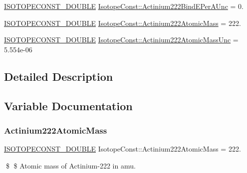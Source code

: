 \begin{DoxyCompactItemize}
\mbox{\hyperlink{group___isotope_const-_macros_ga8f45a7272ce02c0b4c65c44636ed719a}{I\+S\+O\+T\+O\+P\+E\+C\+O\+N\+S\+T\+\_\+\+D\+O\+U\+B\+LE}} \mbox{\hyperlink{group___isotope_const-_actinium-_ac222_ga3478d09e80a5c8eec554208d4afb40cb}{Isotope\+Const\+::\+Actinium222\+Bind\+E\+Per\+A\+Unc}} = 0.
\item 
\mbox{\hyperlink{group___isotope_const-_macros_ga8f45a7272ce02c0b4c65c44636ed719a}{I\+S\+O\+T\+O\+P\+E\+C\+O\+N\+S\+T\+\_\+\+D\+O\+U\+B\+LE}} \mbox{\hyperlink{group___isotope_const-_actinium-_ac222_ga1f83f992783a6a7c8ec5bcdefbbdd8f0}{Isotope\+Const\+::\+Actinium222\+Atomic\+Mass}} = 222.
\item 
\mbox{\hyperlink{group___isotope_const-_macros_ga8f45a7272ce02c0b4c65c44636ed719a}{I\+S\+O\+T\+O\+P\+E\+C\+O\+N\+S\+T\+\_\+\+D\+O\+U\+B\+LE}} \mbox{\hyperlink{group___isotope_const-_actinium-_ac222_ga41d72f51402e43dfc9942edce360fc5d}{Isotope\+Const\+::\+Actinium222\+Atomic\+Mass\+Unc}} = 5.\+554e-\/06
\end{DoxyCompactItemize}


\subsection{Detailed Description}


\subsection{Variable Documentation}
\mbox{\label{group___isotope_const-_actinium-_ac222_ga1f83f992783a6a7c8ec5bcdefbbdd8f0}} 
\subsubsection{\texorpdfstring{Actinium222\+Atomic\+Mass}{Actinium222AtomicMass}}
{\footnotesize\ttfamily \mbox{\hyperlink{group___isotope_const-_macros_ga8f45a7272ce02c0b4c65c44636ed719a}{I\+S\+O\+T\+O\+P\+E\+C\+O\+N\+S\+T\+\_\+\+D\+O\+U\+B\+LE}} Isotope\+Const\+::\+Actinium222\+Atomic\+Mass = 222.}

\$ \$ Atomic mass of Actinium-\/222 in amu. \mbox{\label{group___isotope_const-_actinium-_ac222_ga41d72f51402e43dfc9942edce360fc5d}} 

